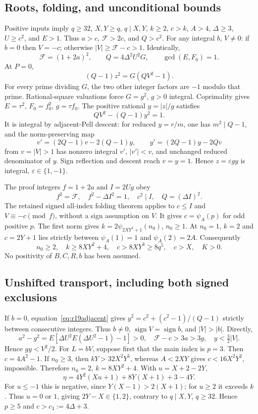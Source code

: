 \subsection{Roots, folding, and unconditional bounds}
Positive inputs imply $q\ge32$, $X,Y\ge q$, $q\mid X,Y$, $k\ge2$, $c>k$,
$A>4$, $\Delta\ge3$, $U\ge c^2$, and $E>1$. Thus $a>c$,
$\mathcal F>2c$, and $Q>c^2$. For any integral $b$, $V\ne0$: if $b=0$
then $V=-c$; otherwise $|V|\ge\mathcal F-c>1$. Identically,
\[
 \mathcal F=(1+2a)^2,\qquad Q=4\Delta^2U^2G,\qquad \gcd(E,F_0)=1.
\]
At $P=0$,
\[
 (Q-1)z^2=G(QV^2-1).
\]
For every prime dividing $G$, the two other integer factors are $-1$
modulo that prime. Rational-square valuations force $G=g^2$, $g>0$
integral. Coprimality gives $E=\tau^2$, $F_0=f_0^2$, $g=\tau f_0$.
The positive rational $y=|z|/g$ satisfies
\begin{equation}
 QV^2-(Q-1)y^2=1.\label{eq:r19adjacent}
\end{equation}
It is integral by adjacent-Pell descent: for reduced $y=r/m$, one has
$m^2\mid Q-1$, and the norm-preserving map
\[
 v'=(2Q-1)v-2(Q-1)y,\qquad y'=(2Q-1)y-2Qv
\]
from $v=|V|>1$ has nonzero integral $v'$, $|v'|<v$, and unchanged reduced
denominator of $y$. Sign reflection and descent reach $v=y=1$.
Hence $z=\varepsilon gy$ is integral, $\varepsilon\in\{1,-1\}$.

The proof integers $f=1+2a$ and $I=2Ug$ obey
\[
 f^2=\mathcal F,\quad f^2-\Delta I^2=1,\quad c^2\mid I,
 \quad Q=(\Delta I)^2.
\]
The retained signed all-index folding theorem applies to $c\le I$ and
$V\equiv-c\pmod f$, without a sign assumption on $V$. It gives
$c=\psi_A(p)$ for odd positive $p$. The first norm gives
$k=2\psi_{2XY^2+1}(n_0)$, $n_0\ge1$. At $n_0=1$, $k=2$ and
$c=2Y+1$ lies strictly between $\psi_A(1)=1$ and $\psi_A(2)=2A$.
Consequently
\begin{equation}
 n_0\ge2,\quad k\ge8XY^2+4,\quad c>8XY^3\ge8q^5,
 \quad c>X,\quad K>0.\label{eq:r19uncond}
\end{equation}
No positivity of $B,C,R,b$ has been assumed.

\subsection{Unshifted transport, including both signed exclusions}
If $b=0$, equation~\eqref{eq:r19adjacent} gives
$y^2=c^2+(c^2-1)/(Q-1)$ strictly between consecutive integers.
Thus $b\ne0$, $\operatorname{sign}V=\operatorname{sign}b$, and
$|V|>|b|$. Directly,
\[
 a^2-g^2=E[\Delta U^2E(\Delta U^2-1)-1]>0,
 \quad \mathcal F-c>3a>3g,\quad y<\tfrac32|V|.
\]
Hence $gy<V^2/2$.
For $L=bV$, suppose first that the main index is $p=3$.
Then $c=4A^2-1$. If $n_0\ge3$, then $kY>32X^2Y^5$, whereas
$A<2XY$ gives $c<16X^2Y^2$, impossible. Therefore $n_0=2$,
$k=8XY^2+4$. With $u=X+2-2Y$,
\[
 \eta=4Y^2(Xu+1)+8Y(X+1)+3-4Y.
\]
For $u\le-1$ this is negative, since $Y(X-1)>2(X+1)$; for $u\ge2$
it exceeds $k$. Thus $u=0$ or $1$, giving $2Y-X\in\{1,2\}$,
contrary to $q\mid X,Y$, $q\ge32$. Hence $p\ge5$ and
$c>c_3:=4\Delta+3$.

